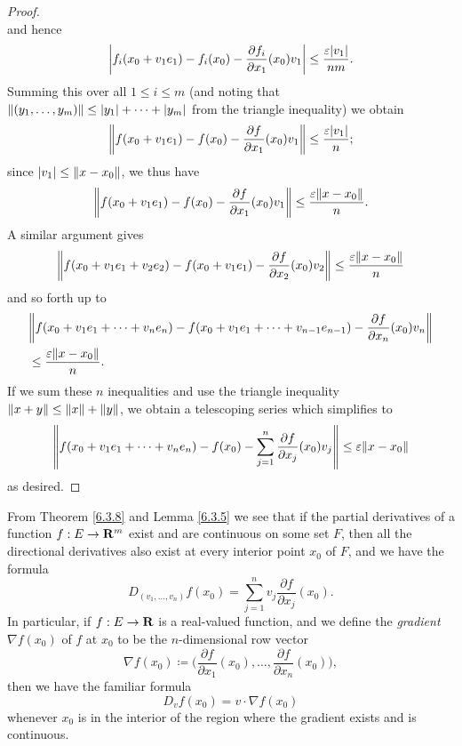 \begin{proof}
\[    \]
    and hence
    \[
        \abs{f_i(x_0 + v_1 e_1) - f_i(x_0) - \frac{\partial f_i}{\partial x_1}(x_0) v_1} \leq \frac{\varepsilon \abs{v_1}}{nm}.
    \]
    Summing this over all \(1 \leq i \leq m\) (and noting that \(\norm*{(y_1, \dots, y_m)} \leq \abs{y_1} + \dots + \abs{y_m}\) from the triangle inequality) we obtain
    \[
        \norm*{f(x_0 + v_1 e_1) - f(x_0) - \frac{\partial f}{\partial x_1}(x_0) v_1} \leq \frac{\varepsilon \abs{v_1}}{n};
    \]
    since \(\abs{v_1} \leq \norm*{x - x_0}\), we thus have
    \[
        \norm*{f(x_0 + v_1 e_1) - f(x_0) - \frac{\partial f}{\partial x_1}(x_0) v_1} \leq \frac{\varepsilon \norm*{x - x_0}}{n}.
    \]
    A similar argument gives
    \[
        \norm*{f(x_0 + v_1 e_1 + v_2 e_2) - f(x_0 + v_1 e_1) - \frac{\partial f}{\partial x_2}(x_0) v_2} \leq \frac{\varepsilon \norm*{x - x_0}}{n}
    \]
    and so forth up to
    \begin{align*}
         & \norm*{f(x_0 + v_1 e_1 + \dots + v_n e_n) - f(x_0 + v_1 e_1 + \dots + v_{n - 1} e_{n - 1}) - \frac{\partial f}{\partial x_n}(x_0) v_n} \\
         & \leq \frac{\varepsilon \norm*{x - x_0}}{n}.
    \end{align*}
    If we sum these \(n\) inequalities and use the triangle inequality \(\norm*{x + y} \leq \norm*{x} + \norm*{y}\), we obtain a telescoping series which simplifies to
    \[
        \norm*{f(x_0 + v_1 e_1 + \dots + v_n e_n) - f(x_0) - \sum_{j = 1}^n \frac{\partial f}{\partial x_j}(x_0) v_j} \leq \varepsilon \norm*{x - x_0}
    \]
    as desired.
\end{proof}

\begin{additional corollary}\label{ac 6.3.3}
From Theorem \ref{6.3.8} and Lemma \ref{6.3.5} we see that if the partial derivatives of a function \(f : E \to \R^m\) exist and are continuous on some set \(F\), then all the directional derivatives also exist at every interior point \(x_0\) of \(F\), and we have the formula
\[
    D_{(v_1, \dots, v_n)} f(x_0) = \sum_{j = 1}^n v_j \frac{\partial f}{\partial x_j}(x_0).
\]
In particular, if \(f : E \to \R\) is a real-valued function, and we define the \emph{gradient} \(\nabla f(x_0)\) of \(f\) at \(x_0\) to be the \(n\)-dimensional row vector
\[
    \nabla f(x_0) \coloneqq \bigg(\frac{\partial f}{\partial x_1}(x_0), \dots, \frac{\partial f}{\partial x_n}(x_0)\bigg),
\]
then we have the familiar formula
\[
    D_v f(x_0) = v \cdot \nabla f(x_0)
\]
whenever \(x_0\) is in the interior of the region where the gradient exists and is continuous.
\end{additional corollary}

